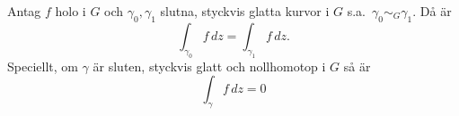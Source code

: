 \begin{theorem}
Antag $f$ holo i $G$ och $\gamma_0, \gamma_1$ slutna, styckvis glatta kurvor i $G$ s.a.\ $\gamma_0 \sim_G \gamma_1$. Då är
\[ \int_{\gamma_0} f\,dz = \int_{\gamma_1} f\,dz. \]
Speciellt, om $\gamma$ är sluten, styckvis glatt och nollhomotop i $G$ så är
\[ \int_\gamma f\,dz = 0 \]
\end{theorem}
